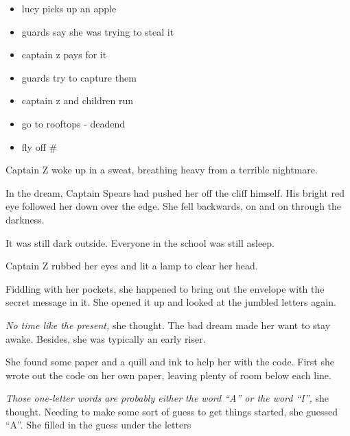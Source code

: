 \documentclass[12pt]{extbook}
\begin{document}
  \begin{itemize}
  \itemsep1pt\parskip0pt
  \item
    lucy picks up an apple
  \item
    guards say she was trying to steal it
  \item
    captain z pays for it
  \item
    guards try to capture them
  \item
    captain z and children run
  \item
    go to rooftops - deadend
  \item
    fly off \#
  \end{itemize}
  
  Captain Z woke up in a sweat, breathing heavy from a terrible nightmare.
  
  In the dream, Captain Spears had pushed her off the cliff himself. His
  bright red eye followed her down over the edge. She fell backwards, on
  and on through the darkness.
  
  It was still dark outside. Everyone in the school was still asleep.
  
  Captain Z rubbed her eyes and lit a lamp to clear her head.
  
  Fiddling with her pockets, she happened to bring out the envelope with
  the secret message in it. She opened it up and looked at the jumbled
  letters again.
  
  \emph{No time like the present,} she thought. The bad dream made her
  want to stay awake. Besides, she was typically an early riser.
  
  She found some paper and a quill and ink to help her with the code.
  First she wrote out the code on her own paper, leaving plenty of room
  below each line.
  
  \textcolor{Grayr}{}
  
  \textcolor{Grayr}{}
  
  \textcolor{Grayr}{}
  
  \textcolor{Grayr}{}
  
  \textcolor{Grayr}{}
  
  \textcolor{Grayr}{}
  
  \emph{Those one-letter words are probably either the word \enquote{A} or
  the word \enquote{I},} she thought. Needing to make some sort of guess
  to get things started, she guessed \enquote{A}. She filled in the guess
  under the letters
  
\end{document}
